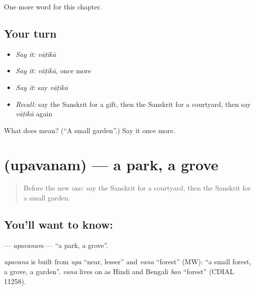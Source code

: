 \begin{grammarlens}[title={What you've built}]
One more word for this chapter.
\end{grammarlens}

\subsection*{Your turn}
\begin{itemize}
\raggedright
  \item \emph{Say it:} \emph{vāṭikā}
  \item \emph{Say it:} \emph{vāṭikā}, once more
  \item \emph{Say it:} say \emph{vāṭikā}
  \item \emph{Recall:} say the Sanskrit for a gift, then the Sanskrit for a courtyard, then say \emph{vāṭikā} again
\end{itemize}

\begin{tcolorbox}[breakable,colback=teal!4,colframe=teal!35!black,title={Before you move on}]
What does  mean? (\textquotedblleft{}A small garden\textquotedblright{}.) Say it once more.
\end{tcolorbox}
\section[\texorpdfstring{\sk{उपवनम्} (upavanam)}{उपवनम् (upavanam)}]{ (upavanam) — a park, a grove}

\label{lesson:SA-C164-upavanam}



\begin{quote}
Before the new one: say the Sanskrit for a courtyard, then the Sanskrit for a small garden.
\end{quote}

\subsection*{You'll want to know: }
\textbf{} — \emph{upavanam} — \textquotedblleft{}a park, a grove\textquotedblright{}.

\begin{cousinweb}
\emph{upavana} is built from \emph{upa} \textquotedblleft{}near, lesser\textquotedblright{} and \emph{vana} \textquotedblleft{}forest\textquotedblright{} (MW): \textquotedblleft{}a small forest, a grove, a garden\textquotedblright{}. \emph{vana} lives on as Hindi and Bengali \emph{ban} \textquotedblleft{}forest\textquotedblright{} (CDIAL 11258).
\end{cousinweb}

